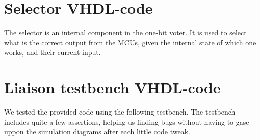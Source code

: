 \documentclass[11pt]{article}
\begin{document}
\section{Selector VHDL-code}
The selector is an internal component in the one-bit voter. It
is used to select what is the correct output from the MCUs, given
the internal state of which one works, and their current input.

\section{Liaison testbench VHDL-code}
We tested the provided code using the following testbench.
The testbench includes quite a few assertions, helping us finding
bugs without having to gase uppon the simulation diagrams after
each little code tweak.

\end{document}

